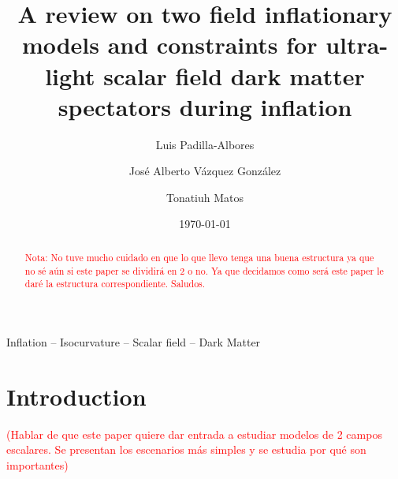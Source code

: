 \documentclass[amssymb,twocolumn,prd,nofootinbib,showpacs]{revtex4-1}
\begin{document}
\title{A review on two field inflationary models and constraints for ultra-light scalar field dark matter spectators during inflation}
\author{Luis Padilla-Albores}  
   \author{Jos\'e Alberto V\'azquez Gonz\'alez}  
\author{Tonatiuh Matos}  
\date{\today}

\begin{abstract}
\textcolor{red}{Nota: No tuve mucho cuidado en que lo que llevo tenga una buena estructura ya que no s\'e a\'un si este paper se dividir\'a en 2 o no. Ya que decidamos como ser\'a este paper le dar\'e la estructura correspondiente. Saludos.}

\end{abstract}
\begin{keywords}
Inflation  --  Isocurvature  --  Scalar field -- Dark Matter
\end{keywords}

\maketitle



\section{Introduction}
\label{introduction}

\textcolor{red}{(Hablar de que este paper quiere dar entrada a estudiar modelos de 2 campos escalares. Se presentan los escenarios m\'as simples y se estudia por qu\'e son importantes)}
\end{document}
